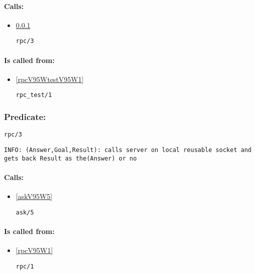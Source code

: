 \paragraph{Calls:} 
\begin{itemize}
\item \ref{rpcV95W3} 
\begin{verbatim}
rpc/3
\end{verbatim}

\end{itemize}
\paragraph{Is called from:} 
\begin{itemize}
\item \ref{rpcV95WtestV95W1} 
\begin{verbatim}
rpc_test/1
\end{verbatim}

\end{itemize}

\subsubsection{Predicate:} \label{rpcV95W3}

\begin{verbatim}
rpc/3
\end{verbatim}

{\small \begin{verbatim}
INFO: (Answer,Goal,Result): calls server on local reusable socket and gets back Result as the(Answer) or no

\end{verbatim}}
\paragraph{Calls:} 
\begin{itemize}
\item \ref{askV95W5} 
\begin{verbatim}
ask/5
\end{verbatim}

\end{itemize}
\paragraph{Is called from:} 
\begin{itemize}
\item \ref{rpcV95W1} 
\begin{verbatim}
rpc/1
\end{verbatim}

\end{itemize}

